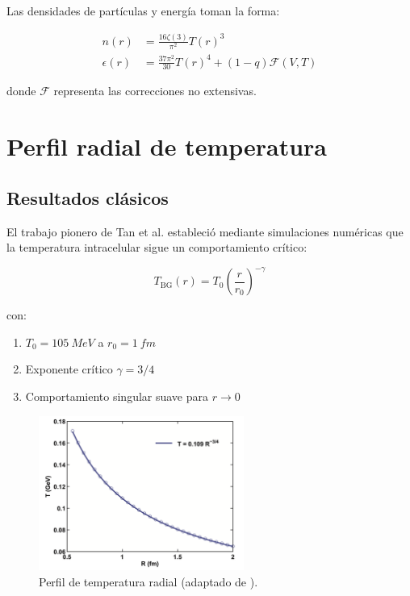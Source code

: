 Las densidades de partículas y energía toman la forma:

\begin{align}
n(r) &= \frac{16\zeta(3)}{\pi^2}T(r)^3 \label{eq-density} \\
\epsilon(r) &= \frac{37\pi^2}{30}T(r)^4 + (1-q)\mathcal{F}(V,T) \label{eq-energy}
\end{align}

donde $\mathcal{F}$ representa las correcciones no extensivas.

\section{Perfil radial de temperatura}
\subsection{Resultados clásicos}
El trabajo pionero de Tan et al. \cite{Tsallis1988} estableció mediante simulaciones numéricas que la temperatura intracelular sigue un comportamiento crítico:

\begin{equation} \label{eq-Tclassic}
T_{\text{BG}}(r) = T_0\left(\frac{r}{r_0}\right)^{-\gamma}
\end{equation}

con:

\begin{enumerate}[ a) ]
    \item $T_0 = \qty{105}{MeV}$ a $r_0 = \qty{1}{fm}$
    \item Exponente crítico $\gamma = 3/4$
    \item Comportamiento singular suave para $r \to 0$
\end{enumerate}

\begin{figure}[h]
    \centering
    \includegraphics[width=0.6\textwidth]{./Images/T(R).png}
    \caption{Perfil de temperatura radial (adaptado de \cite{tan2019}).} %
    \label{fig:Tprofile}
\end{figure}


